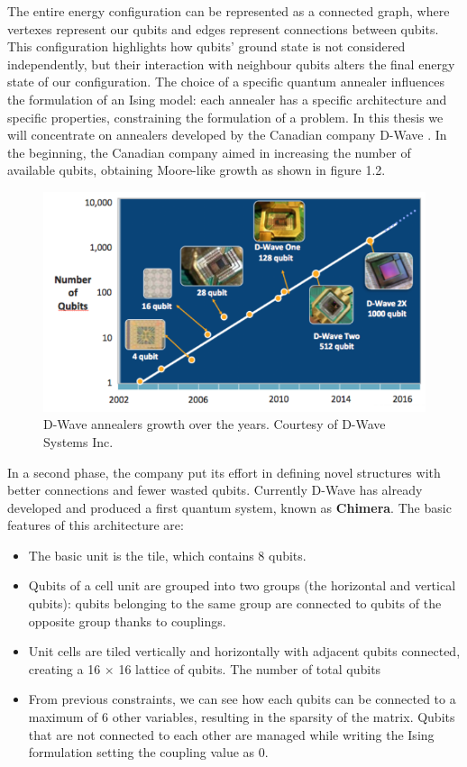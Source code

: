 The entire energy configuration can be represented as a connected graph, where vertexes represent our qubits and edges represent connections between qubits. This configuration highlights how qubits' ground state is not considered independently, but their interaction with neighbour qubits alters the final energy state of our configuration. The choice of a specific quantum annealer influences the formulation of an Ising model: each annealer has a specific architecture and specific properties, constraining the formulation of a problem. In this thesis we will concentrate on annealers developed by the Canadian company D-Wave \cite{Dwave}. In the beginning, the Canadian company aimed in increasing the number of available qubits, obtaining Moore-like growth as shown in figure 1.2. 
\begin{figure}[t]
	\begin{center}
	\includegraphics{images/DwaveMoore.PNG}
	\caption{D-Wave annealers growth over the years. Courtesy of D-Wave Systems Inc.}
	\end{center}
\end{figure}
In a second phase, the company put its effort in defining novel structures with better connections and fewer wasted qubits. Currently D-Wave has already developed and produced a first quantum system, known as \textbf{Chimera}. The basic features of this architecture are:

\begin{itemize}
    \item The basic unit is the tile, which contains 8 qubits.
    \item Qubits of a cell unit are grouped into two groups (the horizontal and vertical qubits): qubits belonging to the same group are connected to qubits of the opposite group thanks to couplings.
    \item Unit cells are tiled vertically and horizontally with adjacent qubits connected, creating a 16 $\times$ 16 lattice of qubits. The number of total qubits 
    \item From previous constraints, we can see how each qubits can be connected to a maximum of 6 other variables, resulting in the sparsity of the matrix. Qubits that are not connected to each other are managed while writing the Ising formulation setting the coupling value as 0.
\end{itemize}

